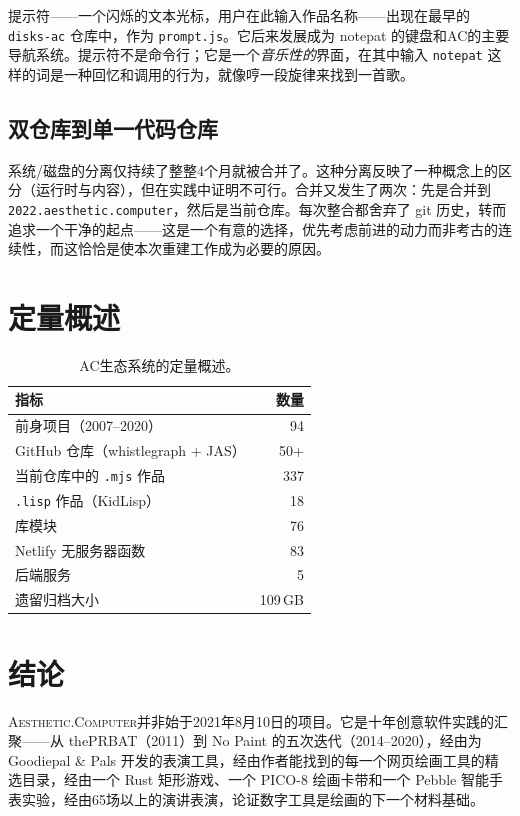 \documentclass[10pt,letterpaper,twocolumn]{article}
\newcommand{\ac}{\textsc{Aesthetic.Computer}}
\begin{document}
提示符——一个闪烁的文本光标，用户在此输入作品名称——出现在最早的 \texttt{disks-ac} 仓库中，作为 \texttt{prompt.js}。它后来发展成为 notepat 的键盘和AC的主要导航系统。提示符不是命令行；它是一个\emph{音乐性的}界面，在其中输入 \texttt{notepat} 这样的词是一种回忆和调用的行为，就像哼一段旋律来找到一首歌。

\subsection{双仓库到单一代码仓库}

系统/磁盘的分离仅持续了整整4个月就被合并了。这种分离反映了一种概念上的区分（运行时与内容），但在实践中证明不可行。合并又发生了两次：先是合并到 \texttt{2022.aesthetic.computer}，然后是当前仓库。每次整合都舍弃了 git 历史，转而追求一个干净的起点——这是一个有意的选择，优先考虑前进的动力而非考古的连续性，而这恰恰是使本次重建工作成为必要的原因。


\section{定量概述}

\begin{table}[h]
\small
\centering
\begin{tabular}{lr}
\toprule
\textbf{指标} & \textbf{数量} \\
\midrule
前身项目（2007--2020） & 94 \\
GitHub 仓库（whistlegraph + JAS） & 50+ \\
当前仓库中的 \texttt{.mjs} 作品 & 337 \\
\texttt{.lisp} 作品（KidLisp） & 18 \\
库模块 & 76 \\
Netlify 无服务器函数 & 83 \\
后端服务 & 5 \\
遗留归档大小 & 109\,GB \\
\bottomrule
\end{tabular}
\caption{AC生态系统的定量概述。}
\end{table}


\section{结论}

\ac{}并非始于2021年8月10日的项目。它是十年创意软件实践的汇聚——从 thePRBAT（2011）到 No Paint 的五次迭代（2014--2020），经由为 Goodiepal \& Pals 开发的表演工具，经由作者能找到的每一个网页绘画工具的精选目录，经由一个 Rust 矩形游戏、一个 PICO-8 绘画卡带和一个 Pebble 智能手表实验，经由65场以上的演讲表演，论证数字工具是绘画的下一个材料基础。
\end{document}
